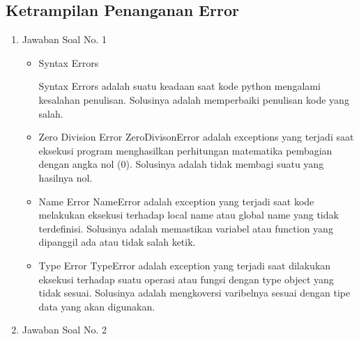 \subsection{Ketrampilan Penanganan Error}
\begin{enumerate}
\item Jawaban Soal No. 1
\begin{itemize}
\item Syntax Errors
\par Syntax Errors adalah suatu keadaan saat kode python mengalami kesalahan penulisan. Solusinya adalah memperbaiki penulisan kode yang salah.

\item Zero Division Error
ZeroDivisonError adalah exceptions yang terjadi saat eksekusi program menghasilkan perhitungan matematika pembagian dengan angka nol (0). Solusinya adalah tidak membagi suatu yang hasilnya nol.

\item Name Error
NameError adalah exception yang terjadi saat kode melakukan eksekusi terhadap local name atau global name yang tidak terdefinisi. Solusinya adalah memastikan variabel atau function yang dipanggil ada atau tidak salah ketik.

\item Type Error
TypeError adalah exception yang terjadi saat dilakukan eksekusi terhadap suatu operasi atau fungsi dengan type object yang tidak sesuai. Solusinya adalah mengkoversi varibelnya sesuai dengan tipe data yang akan digunakan.

\end{itemize}

\item Jawaban Soal No. 2																			

\end{enumerate}


